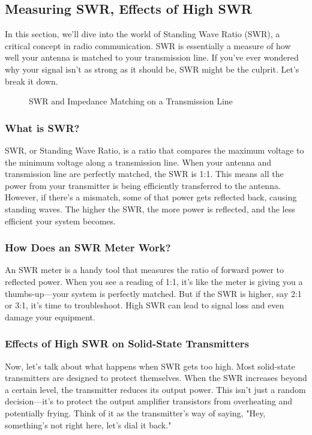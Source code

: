 \subsection{Measuring SWR, Effects of High SWR}
\label{subsec:measuring-swr}

In this section, we'll dive into the world of Standing Wave Ratio (SWR), a critical concept in radio communication. SWR is essentially a measure of how well your antenna is matched to your transmission line. If you've ever wondered why your signal isn't as strong as it should be, SWR might be the culprit. Let's break it down.

\begin{figure}[h]
    \centering
    \caption{SWR and Impedance Matching on a Transmission Line}
    \label{fig:swr-impedance}
\end{figure}


\subsubsection*{What is SWR?}
SWR, or Standing Wave Ratio, is a ratio that compares the maximum voltage to the minimum voltage along a transmission line. When your antenna and transmission line are perfectly matched, the SWR is 1:1. This means all the power from your transmitter is being efficiently transferred to the antenna. However, if there's a mismatch, some of that power gets reflected back, causing standing waves. The higher the SWR, the more power is reflected, and the less efficient your system becomes.



\subsubsection*{How Does an SWR Meter Work?}
An SWR meter is a handy tool that measures the ratio of forward power to reflected power. When you see a reading of 1:1, it's like the meter is giving you a thumbs-up—your system is perfectly matched. But if the SWR is higher, say 2:1 or 3:1, it's time to troubleshoot. High SWR can lead to signal loss and even damage your equipment.

\subsubsection*{Effects of High SWR on Solid-State Transmitters}
Now, let's talk about what happens when SWR gets too high. Most solid-state transmitters are designed to protect themselves. When the SWR increases beyond a certain level, the transmitter reduces its output power. This isn't just a random decision—it's to protect the output amplifier transistors from overheating and potentially frying. Think of it as the transmitter's way of saying, "Hey, something's not right here, let's dial it back."

